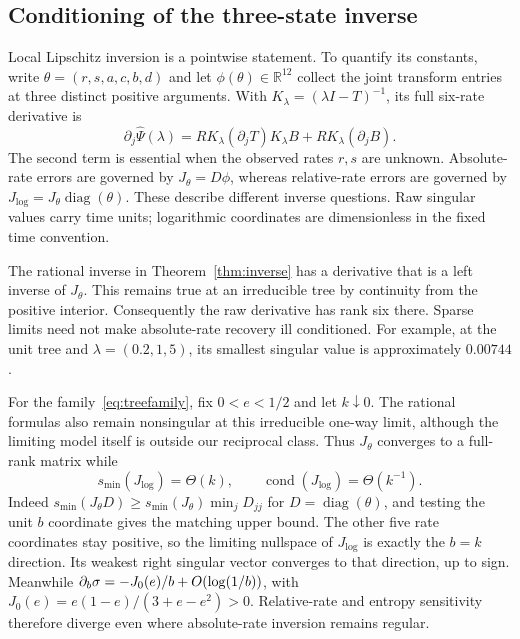 \subsection{Conditioning of the three-state inverse}\label{subsec:conditioning}

Local Lipschitz inversion is a pointwise statement. To quantify its constants,
write $\theta=(r,s,a,c,b,d)$ and let $\phi(\theta)\in\mathbb R^{12}$ collect
the joint transform entries at three distinct positive arguments. With
$K_\lambda=(\lambda I-T)^{-1}$, its full six-rate derivative is
\begin{equation}
 \partial_j\widehat\Psi(\lambda)
 =RK_\lambda(\partial_jT)K_\lambda B
   +RK_\lambda(\partial_jB).\label{eq:transform-jacobian}
\end{equation}
The second term is essential when the observed rates $r,s$ are unknown.
Absolute-rate errors are governed by $J_\theta=D\phi$, whereas relative-rate
errors are governed by $J_{\log}=J_\theta\operatorname{diag}(\theta)$.
These describe different inverse questions. Raw singular values carry time
units; logarithmic coordinates are dimensionless in the fixed time convention.

The rational inverse in Theorem~\ref{thm:inverse} has a derivative that is a
left inverse of $J_\theta$. This remains true at an irreducible tree by
continuity from the positive interior. Consequently the raw derivative has
rank six there. Sparse limits need not make absolute-rate recovery ill
conditioned. For example, at the unit tree and $\lambda=(0.2,1,5)$, its smallest
singular value is approximately $0.00744$.

For the family~\eqref{eq:treefamily}, fix $0<e<1/2$ and let $k\downarrow0$.
The rational formulas also remain nonsingular at this irreducible one-way
limit, although the limiting model itself is outside our reciprocal class.
Thus $J_\theta$ converges to a full-rank matrix while
\begin{equation}
 s_{\min}(J_{\log})=\Theta(k),\qquad
 \operatorname{cond}(J_{\log})=\Theta(k^{-1}).\label{eq:log-conditioning}
\end{equation}
Indeed $s_{\min}(J_\theta D)\ge s_{\min}(J_\theta)\min_jD_{jj}$ for
$D=\operatorname{diag}(\theta)$, and testing the unit $b$ coordinate gives
the matching upper bound. The other five rate coordinates stay positive,
so the limiting nullspace of $J_{\log}$ is exactly the $b=k$ direction.
Its weakest right singular vector converges to that direction, up to sign.
Meanwhile $\partial_b\sigma=-J_0(e)/b+O(\log(1/b))$, with
$J_0(e)=e(1-e)/(3+e-e^2)>0$. Relative-rate and entropy sensitivity therefore
diverge even where absolute-rate inversion remains regular.

